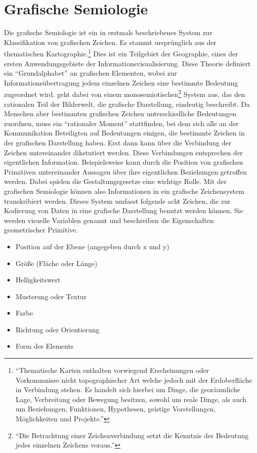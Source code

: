 \documentclass[a4paper, 12pt, DIVcalc, onepage, pdftex, headsepline, footsepline]{scrreprt}
\begin{document}
\section{Grafische Semiologie}
\label{sec:grafischeSemiologie}
Die grafische Semiologie ist ein in \citep{Bertin} erstmals beschriebenes System zur Klassifikation von grafischen Zeichen.
Es stammt ursprünglich aus der thematischen Kartographie.\footnote{"`Thematische Karten enthalten vorwiegend
Erscheinungen oder Vorkommnisse nicht topographischer Art welche jedoch mit der Erdoberfläche in Verbindung
stehen. Es handelt sich hierbei um Dinge, die georäumliche Lage, Verbreitung oder Bewegung besitzen, sowohl
um reale Dinge, als auch um Beziehungen, Funktionen, Hypothesen, geistige Vorstellungen, Möglichkeiten und
Projekte."'\citep{Gitta} } Dies ist ein Teilgebiet der Geographie, eines der ersten Anwendungsgebiete der
Informationsvisualisierung.
Diese Theorie definiert ein "`Grundalphabet"' an grafischen Elementen, wobei zur Informationsübertragung
jedem einzelnen Zeichen eine bestimmte Bedeutung zugeordnet wird. \citep{Bertin} geht dabei von einem
monosemiotischen\footnote{"`Die Betrachtung einer Zeichenverbindung setzt die Kenntnis der Bedeutung jedes
einzelnen Zeichens voraus."'\citep[S.\,3]{Bertin}} System aus, das den rationalen Teil der Bilderwelt, die
grafische Darstellung, eindeutig beschreibt.
Da Menschen aber bestimmten grafischen Zeichen unterschiedliche Bedeutungen zuordnen, muss ein "`rationaler Moment"'
stattfinden, bei dem sich alle an der Kommunikation Beteiligten auf Bedeutungen einigen,
die bestimmte Zeichen in der grafischen Darstellung haben. Erst dann kann über die Verbindung der Zeichen untereinander dikstutiert
werden. Diese Verbindungen entsprechen der eigentlichen Information. Beispielsweise kann
durch die Position von grafischen Primitiven untereinander Aussagen über ihre eigentlichen Beziehungen getroffen werden.
Dabei spielen die Gestaltungsgesetze eine wichtige Rolle.
Mit der grafischen Semiologie können also Informationen in ein grafische Zeichensystem
transkribiert werden. Dieses System umfasst folgende acht Zeichen, die zur Kodierung von Daten in eine grafische Darstellung benutzt
werden können. Sie werden visuelle Variablen genannt und beschreiben die Eigenschaften geometrischer Primitive.
\begin{itemize}
\item Position auf der Ebene (angegeben durch x und y)
\item Größe (Fläche oder Länge)
\item Helligkeitswert
\item Musterung oder Textur
\item Farbe
\item Richtung oder Orientierung
\item Form des Elements
\end{itemize}
\end{document}
